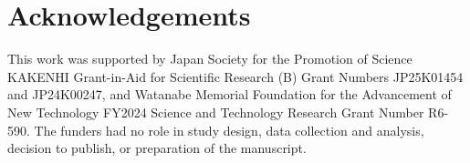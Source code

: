 \makeatletter
\def\@currentlabelname{Acknowledgements}%
\makeatother
\label{section:Acknowledgements}

\section*{Acknowledgements}
{}

This work was supported by Japan Society for the Promotion of Science KAKENHI Grant-in-Aid for Scientific Research (B) Grant Numbers JP25K01454 and JP24K00247, and Watanabe Memorial Foundation for the Advancement of New Technology FY2024 Science and Technology Research Grant Number R6-590. 
The funders had no role in study design, data collection and analysis, decision to publish, or preparation of the manuscript.